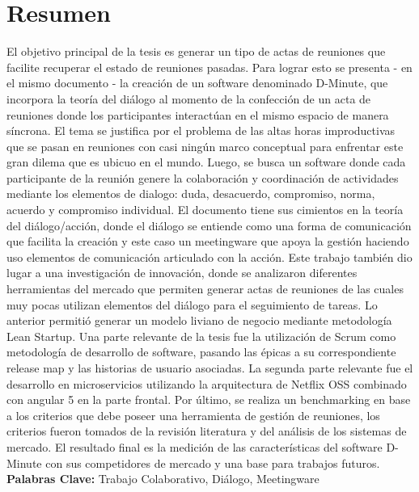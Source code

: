\chapter*{Resumen} %
El objetivo principal de la tesis es generar un tipo de actas de reuniones que facilite recuperar el estado de reuniones pasadas. Para lograr esto se presenta - en el mismo documento - la creación de un software denominado D-Minute, que incorpora la teoría del diálogo al momento de la confección de un acta de reuniones donde los participantes interactúan en el mismo espacio de manera síncrona. El tema se justifica por el problema de las altas horas improductivas que se pasan en reuniones con casi ningún marco conceptual para enfrentar este gran dilema que es ubicuo en el mundo. Luego,  se busca un software donde cada participante de la reunión genere la colaboración y coordinación de actividades mediante los elementos de dialogo: duda, desacuerdo, compromiso, norma, acuerdo y compromiso individual. El documento tiene sus cimientos en la teoría del diálogo/acción, donde el diálogo se entiende como una forma de comunicación que facilita la creación y este caso un meetingware que apoya la gestión haciendo uso elementos de comunicación articulado con la acción.
Este trabajo también dio lugar a una investigación de innovación, donde se analizaron diferentes herramientas del mercado que permiten generar actas de reuniones de las cuales muy pocas utilizan elementos del diálogo para el seguimiento de tareas. Lo anterior permitió generar un modelo liviano de negocio mediante metodología Lean Startup.
Una parte relevante de la tesis fue la utilización de Scrum como metodología de desarrollo de software, pasando las épicas a su correspondiente release map y las historias de usuario asociadas. La segunda parte relevante fue el desarrollo en microservicios utilizando la arquitectura de Netflix OSS combinado con angular 5 en la parte frontal.
Por último, se realiza un benchmarking en base a los criterios que debe poseer una herramienta de gestión de reuniones, los criterios fueron tomados de la revisión literatura y del análisis de los sistemas de mercado. El resultado final es la medición de las características del software D-Minute con sus competidores de mercado y una base para trabajos futuros. \newline 
\newline\textbf{Palabras Clave:} Trabajo Colaborativo, Diálogo, Meetingware